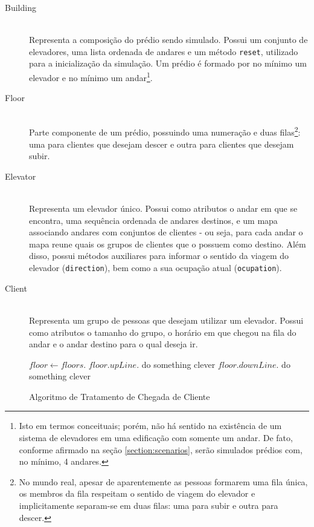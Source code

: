 \begin{description}
  \item[Building] \hfill \\
    Representa a composição do prédio sendo simulado. Possui um conjunto de
    elevadores, uma lista ordenada de andares e um método \texttt{reset},
    utilizado para a inicialização da simulação. Um prédio é formado por no
    mínimo um elevador e no mínimo um andar\footnote{Isto em termos conceituais;
    porém, não há sentido na existência de um sistema de elevadores em uma
    edificação com somente um andar. De fato, conforme afirmado na seção
    \ref{section:scenarios}, serão simulados prédios com, no mínimo, 4
    andares.}.

  \item[Floor] \hfill \\
    Parte componente de um prédio, possuindo uma numeração e duas
    filas\footnote{No mundo real, apesar de aparentemente as pessoas formarem
    uma fila única, os membros da fila respeitam o sentido de viagem do elevador
    e implicitamente separam-se em duas filas: uma para subir e outra para
    descer.}: uma para clientes que desejam descer e outra para clientes que
    desejam subir.

\item[Elevator] \hfill \\
    Representa um elevador único. Possui como atributos o andar em que se
    encontra, uma sequência ordenada de andares destinos, e um mapa associando
    andares com conjuntos de clientes - ou seja, para cada andar o mapa reune
    quais os grupos de clientes que o possuem como destino. Além disso, possui
    métodos auxiliares para informar o sentido da viagem do elevador
    (\texttt{direction}), bem como a sua ocupação atual (\texttt{ocupation}).

\item[Client] \hfill \\
    Representa um grupo de pessoas que desejam utilizar um elevador. Possui como
    atributos o tamanho do grupo, o horário em que chegou na fila do andar e o
    andar destino para o qual deseja ir.

    \begin{algorithm}[H]
    \begin{center}
    \begin{algorithmic}[1]
      \State $floor \gets floors.$
          \State $floor.upLine.$
        \Else
          \State do something clever
        \EndIf
      \Else
          \State $floor.downLine.$
        \Else
          \State do something clever
        \EndIf
      \EndIf
    \EndFunction
    \end{algorithmic}
    \end{center}
    \caption
       {\label{alg:state:clientarrival}Algoritmo de Tratamento de Chegada de Cliente}
    \end{algorithm}


\end{description}
